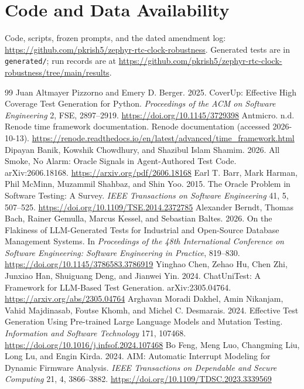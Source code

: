 \documentclass[sigconf,nonacm]{acmart}
\begin{document}
\section*{Code and Data Availability}
Code, scripts, frozen prompts, and the dated amendment log: \url{https://github.com/pkrish5/zephyr-rtc-clock-robustness}. Generated tests are in \texttt{generated/}; run records are at \url{https://github.com/pkrish5/zephyr-rtc-clock-robustness/tree/main/results}.

\begin{thebibliography}{99}
 Juan Altmayer Pizzorno and Emery D. Berger. 2025. CoverUp: Effective High Coverage Test Generation for Python. \emph{Proceedings of the ACM on Software Engineering} 2, FSE, 2897--2919. \url{https://doi.org/10.1145/3729398}
 Antmicro. n.d. Renode time framework documentation. Renode documentation (accessed 2026-10-13). \url{https://renode.readthedocs.io/en/latest/advanced/time_framework.html}
 Dipayan Banik, Kowshik Chowdhury, and Shazibul Islam Shamim. 2026. All Smoke, No Alarm: Oracle Signals in Agent-Authored Test Code. arXiv:2606.18168. \url{https://arxiv.org/pdf/2606.18168}
 Earl T. Barr, Mark Harman, Phil McMinn, Muzammil Shahbaz, and Shin Yoo. 2015. The Oracle Problem in Software Testing: A Survey. \emph{IEEE Transactions on Software Engineering} 41, 5, 507--525. \url{https://doi.org/10.1109/TSE.2014.2372785}
 Alexander Berndt, Thomas Bach, Rainer Gemulla, Marcus Kessel, and Sebastian Baltes. 2026. On the Flakiness of LLM-Generated Tests for Industrial and Open-Source Database Management Systems. In \emph{Proceedings of the 48th International Conference on Software Engineering: Software Engineering in Practice}, 819--830. \url{https://doi.org/10.1145/3786583.3786919}
 Yinghao Chen, Zehao Hu, Chen Zhi, Junxiao Han, Shuiguang Deng, and Jianwei Yin. 2024. ChatUniTest: A Framework for LLM-Based Test Generation. arXiv:2305.04764. \url{https://arxiv.org/abs/2305.04764}
 Arghavan Moradi Dakhel, Amin Nikanjam, Vahid Majdinasab, Foutse Khomh, and Michel C. Desmarais. 2024. Effective Test Generation Using Pre-trained Large Language Models and Mutation Testing. \emph{Information and Software Technology} 171, 107468. \url{https://doi.org/10.1016/j.infsof.2024.107468}
 Bo Feng, Meng Luo, Changming Liu, Long Lu, and Engin Kirda. 2024. AIM: Automatic Interrupt Modeling for Dynamic Firmware Analysis. \emph{IEEE Transactions on Dependable and Secure Computing} 21, 4, 3866--3882. \url{https://doi.org/10.1109/TDSC.2023.3339569}

\end{thebibliography}
\end{document}
